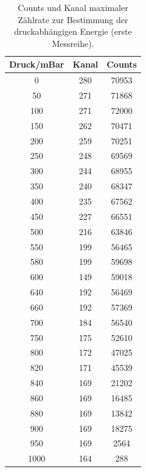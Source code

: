 \begin{table}
  \centering
  \caption{Counts und Kanal maximaler Zählrate zur Bestimmung der druckabhängigen Energie (erste Messreihe).}
  \label{tab:Energie1}
  \begin{tabular}{c c c}
    \toprule
      Druck/mBar & Kanal & Counts \\
      \midrule
      0     & 280 & 70953 \\
      50    & 271 & 71868 \\
      100   & 271 & 72000 \\
      150   & 262 & 70471 \\
      200   & 259 & 70251 \\
      250   & 248 & 69569 \\
      300   & 244 & 68955 \\
      350   & 240 & 68347 \\
      400   & 235 & 67562 \\
      450   & 227 & 66551 \\
      500   & 216 & 63846 \\
      550   & 199 & 56465 \\
      580   & 199 & 59698 \\
      600   & 149 & 59018 \\
      640   & 192 & 56469 \\
      660   & 192 & 57369 \\
      700   & 184 & 56540 \\
      750   & 175 & 52610 \\
      800   & 172 & 47025 \\
      820   & 171 & 45539 \\
      840   & 169 & 21202 \\
      860   & 169 & 16485 \\
      880   & 169 & 13842 \\
      900   & 169 & 18275 \\
      950   & 169 & 2564  \\
      1000  & 164 & 288 \\
      \bottomrule
  \end{tabular}
\end{table}

